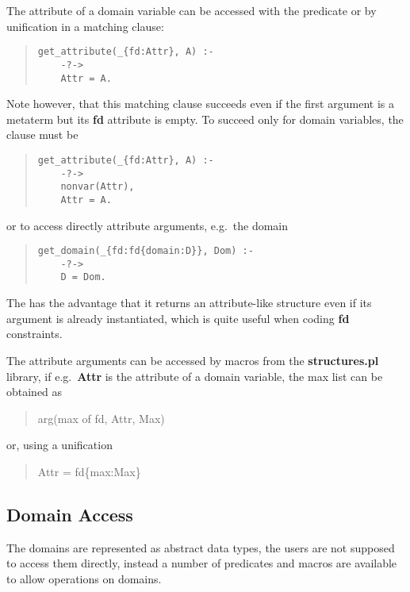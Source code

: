 The attribute of a domain variable can be accessed
with the predicate 
or by unification in a matching clause:
\begin{quote}
\begin{verbatim}
get_attribute(_{fd:Attr}, A) :-
    -?->
    Attr = A.
\end{verbatim}
\end{quote}
Note however, that this matching clause succeeds even if the first
argument is a metaterm but its {\bf fd} attribute is empty.
To succeed only for domain variables, the clause
must be
\begin{quote}
\begin{verbatim}
get_attribute(_{fd:Attr}, A) :-
    -?->
    nonvar(Attr),
    Attr = A.
\end{verbatim}
\end{quote}
or to access directly attribute arguments, e.g.\ the domain
\begin{quote}
\begin{verbatim}
get_domain(_{fd:fd{domain:D}}, Dom) :-
    -?->
    D = Dom.
\end{verbatim}
\end{quote}
The  has the advantage that it returns
an attribute-like structure even if its argument is already
instantiated, which is quite useful when coding {\bf fd}
constraints.

The attribute arguments can be accessed by macros from
the {\bf structures.pl} library,
if e.g.\ {\bf Attr} is the attribute of a domain variable, the max
list can be obtained as

\begin{quote}
arg(max of fd, Attr, Max)
\end{quote}
or, using a unification
\begin{quote}
Attr = fd\{max:Max\}
\end{quote}

\subsection{Domain Access}
\label{domaccess}
The domains are represented as abstract data types, the users are not
supposed to access them directly, instead a number of
predicates and macros are available to allow operations on domains.

